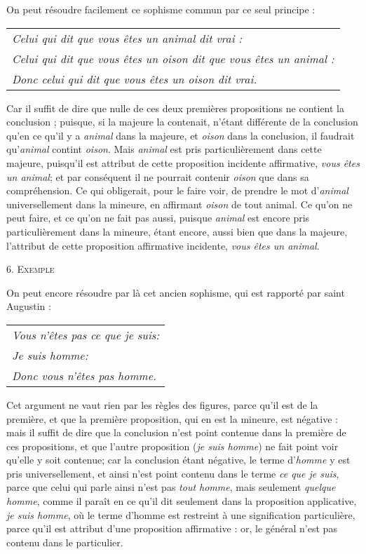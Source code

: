 On peut résoudre facilement ce sophisme commun par ce seul principe :

	\begin{tabularx}{\textwidth}{X}
		\emph{Celui qui dit que vous êtes un animal dit vrai :} \\
		\emph{Celui qui dit que vous êtes un oison dit que vous êtes un animal :} \\
		\emph{Donc celui qui dit que vous êtes un oison dit vrai.} \\
	\end{tabularx}

Car il suffit de dire que nulle de ces deux premières propositions ne contient la conclusion ; puisque, si la majeure la contenait, n'étant différente de la conclusion qu'en ce qu'il y a \emph{animal} dans la majeure, et \emph{oison} dans la conclusion, il faudrait qu'\emph{animal} contint \emph{oison}. Mais \emph{animal} est pris particulièrement dans cette majeure, puisqu'il est attribut de cette proposition incidente affirmative, \emph{vous êtes un animal}; et par conséquent il ne pourrait contenir \emph{oison} que dans sa compréhension. Ce qui obligerait, pour le faire voir, de prendre le mot d'\emph{animal} universellement dans la mineure, en affirmant \emph{oison} de tout animal. Ce qu'on ne peut faire, et ce qu'on ne fait pas aussi, puisque \emph{animal} est encore pris particulièrement dans la mineure, étant encore, aussi bien que dans la majeure, l'attribut de cette proposition affirmative incidente, \emph{vous êtes un animal}.

\newpage

\begin{center}{\scshape 6. Exemple}\end{center}

On peut encore résoudre par là cet ancien sophisme, qui est rapporté par saint Augustin :

	\begin{tabularx}{\textwidth}{X}
		\emph{Vous n'êtes pas ce que je suis:} \\
		\emph{Je suis homme:} \\
		\emph{Donc vous n'êtes pas homme.} \\
	\end{tabularx}

Cet argument ne vaut rien par les règles des figures, parce qu'il est de la première, et que la première proposition, qui en est la mineure, est négative : mais il suffit de dire que la conclusion n'est point contenue dans la première de ces propositions, et que l'autre proposition (\emph{je suis homme}) ne fait point voir qu'elle y soit contenue; car la conclusion étant négative, le terme d'\emph{homme} y est pris universellement, et ainsi n'est point contenu dans le terme \emph{ce que je suis}, parce que celui qui parle ainsi n'est pas \emph{tout homme}, mais seulement \emph{quelque homme}, comme il paraît en ce qu'il dit seulement dans la proposition applicative, \emph{je suis homme}, où le terme d'homme est restreint à une signification particulière, parce qu'il est attribut d'une proposition affirmative : or, le général n'est pas contenu dans le particulier.


